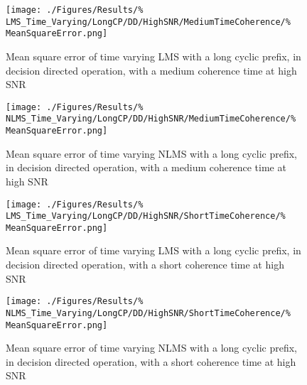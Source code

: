 \begin{figure}[ht]
	\centering
	\begin{minipage}{0.49\textwidth}
		\centering
		\texttt{[image: ./Figures/Results/\%
	LMS\_Time\_Varying/LongCP/DD/HighSNR/MediumTimeCoherence/\%
	MeanSquareError.png]}
		\captionsetup{width=0.75\linewidth}
		\caption{Mean square error of time varying LMS with a 
		long cyclic prefix, in decision directed operation, 
		with a medium coherence time at high SNR}
		\label{fig:Medium-High-Directed-Long}
	\end{minipage}
	\begin{minipage}{0.49\textwidth}
		\centering
		\texttt{[image: ./Figures/Results/\%
	NLMS\_Time\_Varying/LongCP/DD/HighSNR/MediumTimeCoherence/\%
	MeanSquareError.png]}
		\captionsetup{width=0.75\linewidth}
		\caption{Mean square error of time varying NLMS with 
		a long cyclic prefix, in decision directed operation, 
		with a medium coherence time at high SNR}
	\label{fig:NLMS-Medium-High-Directed-Long}
	\end{minipage}
\end{figure}

\begin{figure}[ht]
	\centering
	\begin{minipage}{0.49\textwidth}
		\centering
		\texttt{[image: ./Figures/Results/\%
	LMS\_Time\_Varying/LongCP/DD/HighSNR/ShortTimeCoherence/\%
	MeanSquareError.png]}
		\captionsetup{width=0.75\linewidth}
		\caption{Mean square error of time varying LMS with a 
		long cyclic prefix, in decision directed operation,
		with a short coherence time at high SNR}
	\end{minipage}
	\begin{minipage}{0.49\textwidth}
		\centering
		\texttt{[image: ./Figures/Results/\%
	NLMS\_Time\_Varying/LongCP/DD/HighSNR/ShortTimeCoherence/\%
	MeanSquareError.png]}
		\captionsetup{width=0.75\linewidth}
		\caption{Mean square error of time varying NLMS with 
		a long cyclic prefix, in decision directed operation,
		with a short coherence time at high SNR}
		\label{fig:NLMS-Short-High-Directed-Long}
	\end{minipage}
\end{figure}

